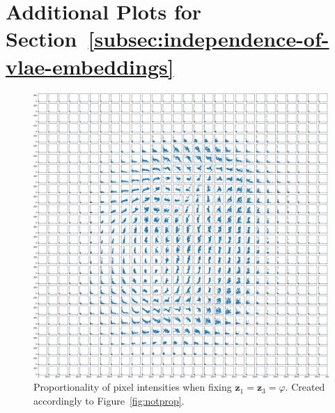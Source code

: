 \documentclass[11pt]{article}
\begin{document}
\section{Additional Plots for Section~\ref{subsec:independence-of-vlae-embeddings}}\label{sec:additional-plots-for-section_independence}
\begin{figure}[H]
\centering
\includegraphics[width=\textwidth]{images/appendix_plots/notprop_1_3.png}
\caption{Proportionality of pixel intensities when fixing $\bm{z}_1 = \bm{z}_3=\varphi$. Created accordingly to Figure~\ref{fig:notprop}.}
\label{fig:notprop_1_3}
\end{figure}
\end{document}
